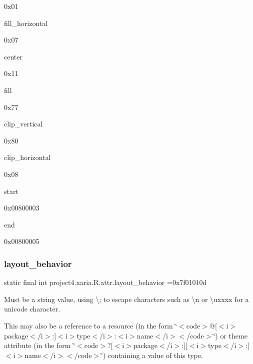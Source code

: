 0x01

{\ttfamily fill\+\_\+horizontal}

0x07

{\ttfamily center}

0x11

{\ttfamily fill}

0x77

{\ttfamily clip\+\_\+vertical}

0x80

{\ttfamily clip\+\_\+horizontal}

0x08

{\ttfamily start}

0x00800003

{\ttfamily end}

0x00800005\mbox{\label{classproject4_1_1xaria_1_1R_1_1attr_a32d21c5b495400a514a4b0be52384ee5}} 
\subsubsection{\texorpdfstring{layout\+\_\+behavior}{layout\_behavior}}
{\footnotesize\ttfamily static final int project4.\+xaria.\+R.\+attr.\+layout\+\_\+behavior =0x7f01010d\hspace{0.3cm}{\ttfamily [static]}}

Must be a string value, using \textquotesingle{}\textbackslash{};\textquotesingle{} to escape characters such as \textquotesingle{}\textbackslash{}n\textquotesingle{} or \textquotesingle{}\textbackslash{}uxxxx\textquotesingle{} for a unicode character. 

This may also be a reference to a resource (in the form \char`\"{}$<$code$>$@\mbox{[}$<$i$>$package$<$/i$>$\+:\mbox{]}$<$i$>$type$<$/i$>$\+:$<$i$>$name$<$/i$>$$<$/code$>$\char`\"{}) or theme attribute (in the form \char`\"{}$<$code$>$?\mbox{[}$<$i$>$package$<$/i$>$\+:\mbox{]}\mbox{[}$<$i$>$type$<$/i$>$\+:\mbox{]}$<$i$>$name$<$/i$>$$<$/code$>$\char`\"{}) containing a value of this type. \mbox{\label{classproject4_1_1xaria_1_1R_1_1attr_a56c9c23c86ea1f70080c0ccbbf29c43a}} 
